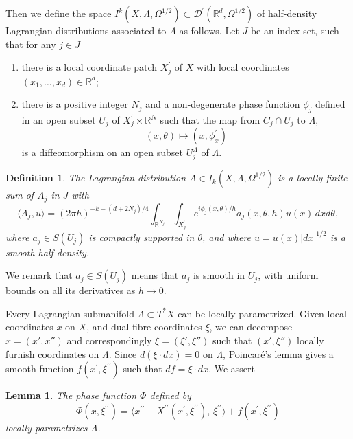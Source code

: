\documentclass[10pt, a4paper, twoside]{amsart}
\numberwithin{equation}{section}
\newtheorem{lemma}[theorem]{Lemma}
\newtheorem{definition}[theorem]{Definition}
\theoremstyle{remark}
\begin{document}
\begin{appendix}
	
	Then we define the space $I^k(X, \Lambda, \Omega^{1/2}) \subset \mathcal{D}^\prime(\mathbb{R}^d, \Omega^{1/2})$ of half-density Lagrangian distributions associated to $\Lambda$ as follows.  Let $J$ be an index set, such that for any $j \in J$ \begin{enumerate}
	\item there is a local coordinate patch $X^\prime_j$ of $X$ with local coordinates $(x_1, \dots, x_d) \in \mathbb{R}^d$; 
	\item there is a positive integer $N_j$ and a non-degenerate phase function $\phi_j$ defined in an open subset $U_j$ of $X_j^\prime \times \mathbb{R}^N $ such that the map from $C_j \cap U_j$ to $\Lambda$, $$(x, \theta) \longmapsto (x, \phi^\prime_x)$$ is a diffeomorphism on an open subset $U_j^\Lambda$ of $\Lambda$.\end{enumerate}
	
	\begin{definition}The Lagrangian distribution $A \in I_k(X, \Lambda, \Omega^{1/2})$ is a locally finite sum of $A_j$ in $J$ with $$\langle A_j, u \rangle = (2\pi h)^{- k - (d + 2N_j)/4} \int_{\mathbb{R}^{N_j}}\int_{X_j^\prime} e^{i\phi_j(x, \theta) / h} a_j(x, \theta, h) u(x) \,dx d\theta,$$ where  $a_j \in S(U_j)$ is compactly supported in $\theta$, and where $u = u(x) |dx|^{1/2}$ is a smooth half-density. \end{definition}
	
	We remark that $a_j \in S(U_j)$ means that $a_j$ is smooth in $U_j$, with uniform bounds on all its derivatives as $h \to 0$. 
	
	
		
	\vskip 5pt 
	
	Every Lagrangian submanifold $\Lambda \subset T^* X$ can be locally parametrized. 
	Given local coordinates $x$ on $X$, and dual fibre coordinates $\xi$, we can decompose $x = (x', x'')$ and correspondingly $\xi = (\xi', \xi'')$ such that $(x', \xi'')$ locally furnish coordinates on $\Lambda$. Since $d(\xi \cdot dx) = 0$ on $\Lambda$,  Poincar\'{e}'s lemma gives a smooth function $f(x^\prime, \xi^{\prime\prime})$ such that $df = \xi \cdot dx$. We assert 
	
	\begin{lemma}\label{new parametrization}  The phase function $\Phi$ defined by  
	$$\Phi(x, \xi^{\prime\prime}) = \langle x^{\prime\prime}-X^{\prime\prime}(x^\prime, \xi^{\prime\prime}), \, \xi^{\prime\prime} \rangle + f(x^\prime, \xi^{\prime\prime})$$
	locally parametrizes $\Lambda$. 
	\end{lemma}
	

\end{appendix}
\end{document}
